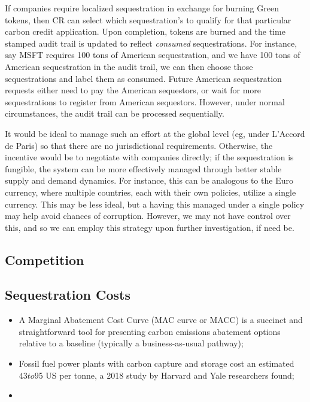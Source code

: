 \documentclass{article}
\begin{document}
If companies require localized sequestration in exchange for burning Green tokens, then CR can select which sequestration’s to qualify for that particular carbon credit application. Upon completion, tokens are burned and the time stamped audit trail is updated to reflect \emph{consumed} sequestrations. For instance, say MSFT requires 100 tons of American sequestration, and we have 100 tons of American sequestration in the audit trail, we can then choose those sequestrations and label them as consumed. Future American sequestration requests either need to pay the American sequestors, or wait for more sequestrations to register from American sequestors. However, under normal circumstances, the audit trail can be processed sequentially.

It would be ideal to manage such an effort at the global level (eg, under L'Accord de Paris) so that there are no jurisdictional requirements. Otherwise, the incentive would be to negotiate with companies directly; if the sequestration is fungible, the system can be more effectively managed through better stable supply and demand dynamics. For instance, this can be analogous to the Euro currency, where multiple countries, each with their own policies, utilize a single currency. This may be less ideal, but a having this managed under a single policy may help avoid chances of corruption. However, we may not have control over this, and so we can employ this strategy upon further investigation, if need be.

\subsection{Competition}

\subsection{Sequestration Costs}

\begin{itemize}
\item A Marginal Abatement Cost Curve (MAC curve or MACC) is a succinct and straightforward tool for presenting carbon emissions abatement options relative to a baseline (typically a business-as-usual pathway); \cite{Mck09}
\item Fossil fuel power plants with carbon capture and storage cost an estimated $43 to $95 US per tonne, a 2018 study by Harvard and Yale researchers found; \cite{Gil18}
\item 
\end{itemize}
\end{document}
